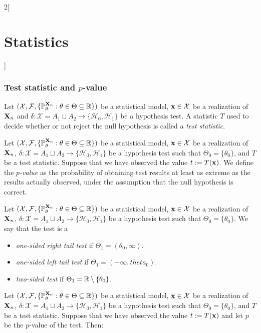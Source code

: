\documentclass[../../../main.tex]{subfiles}
\begin{document}
\begin{multicols}{2}[\section{Statistics}]
  \subsubsection{Test statistic and \texorpdfstring{$p$}{p}-value}
  \begin{definition}
    Let $(\mathcal{X},\mathcal{F},\{\mathbb{P}_\theta^{\boldsymbol{\mathrm{X}}_n}:\theta\in\Theta\subseteq\mathbb{R}\})$ be a statistical model, $\boldsymbol{\mathrm{x}}\in\mathcal{X}$ be a realization of $\boldsymbol{\mathrm{X}}_n$ and $\delta:\mathcal{X}=A_1\sqcup A_2\rightarrow\{\mathcal{H}_0,\mathcal{H}_1\}$ be a hypothesis test. A statistic $T$ used to decide whether or not reject the null hypothesis is called a \emph{test statistic}.
  \end{definition}
  \begin{definition}
    Let $(\mathcal{X},\mathcal{F},\{\mathbb{P}_\theta^{\boldsymbol{\mathrm{X}}_n}:\theta\in\Theta\subseteq\mathbb{R}\})$ be a statistical model, $\boldsymbol{\mathrm{x}}\in\mathcal{X}$ be a realization of $\boldsymbol{\mathrm{X}}_n$, $\delta:\mathcal{X}=A_1\sqcup A_2\rightarrow\{\mathcal{H}_0,\mathcal{H}_1\}$ be a hypothesis test such that $\Theta_0=\{\theta_0\}$, and $T$ be a test statistic. Suppose that we have observed the value $t:=T(\boldsymbol{\mathrm{x}})$. We define the \emph{$p$-value} as the probability of obtaining test results at least as extreme as the results actually observed, under the assumption that the null hypothesis is correct.
  \end{definition}
  \begin{definition}
    Let $(\mathcal{X},\mathcal{F},\{\mathbb{P}_\theta^{\boldsymbol{\mathrm{X}}_n}:\theta\in\Theta\subseteq\mathbb{R}\})$ be a statistical model, $\boldsymbol{\mathrm{x}}\in\mathcal{X}$ be a realization of $\boldsymbol{\mathrm{X}}_n$, $\delta:\mathcal{X}=A_1\sqcup A_2\rightarrow\{\mathcal{H}_0,\mathcal{H}_1\}$ be a hypothesis test such that $\Theta_0=\{\theta_0\}$. We say that the test is a
    \begin{itemize}
      \item \emph{one-sided right tail test} if $\Theta_1=(\theta_0,\infty)$.
      \item \emph{one-sided left tail test} if $\Theta_1=(-\infty,theta_0)$.
      \item \emph{two-sided test} if $\Theta_1=\mathbb{R}\setminus\{\theta_0\}$.
    \end{itemize}
  \end{definition}
  \begin{proposition}
    Let $(\mathcal{X},\mathcal{F},\{\mathbb{P}_\theta^{\boldsymbol{\mathrm{X}}_n}:\theta\in\Theta\subseteq\mathbb{R}\})$ be a statistical model, $\boldsymbol{\mathrm{x}}\in\mathcal{X}$ be a realization of $\boldsymbol{\mathrm{X}}_n$, $\delta:\mathcal{X}=A_1\sqcup A_2\rightarrow\{\mathcal{H}_0,\mathcal{H}_1\}$ be a hypothesis test such that $\Theta_0=\{\theta_0\}$, and $T$ be a test statistic. Suppose that we have observed the value $t:=T(\boldsymbol{\mathrm{x}})$ and let $p$ be the $p$-value of the test. Then:

\end{proposition}
\end{multicols}
\end{document}
